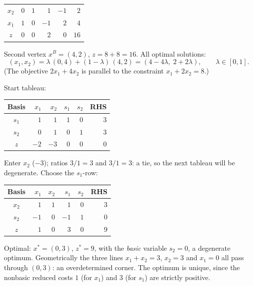 \begin{solutions}
\begin{center}
\begin{tabular}{c|rrrr|r}
        \hline
        $x_2$ & $0$ & $1$ & $1$ & $-1$ & $2$\\
        $x_1$ & $1$ & $0$ & $-1$ & $2$ & $4$\\
        \hline
        $z$ & $0$ & $0$ & $2$ & $0$ & $16$\\
        \hline
        \end{tabular}
        \end{center}
        Second vertex $x^{B}=(4,2)$, $z=8+8=16$. All optimal solutions:
        \[
          (x_1,x_2)=\lambda\,(0,4)+(1-\lambda)\,(4,2)
                   =(4-4\lambda,\;2+2\lambda),\qquad \lambda\in[0,1].
        \]
        (The objective $2x_1+4x_2$ is parallel to the constraint
        $x_1+2x_2=8$.)

  \item Start tableau:
        \begin{center}
        \begin{tabular}{c|rrrr|r}
        \hline
        Basis & $x_1$ & $x_2$ & $s_1$ & $s_2$ & RHS\\
        \hline
        $s_1$ & $1$ & $1$ & $1$ & $0$ & $3$\\
        $s_2$ & $0$ & $1$ & $0$ & $1$ & $3$\\
        \hline
        $z$ & $-2$ & $-3$ & $0$ & $0$ & $0$\\
        \hline
        \end{tabular}
        \end{center}
        Enter $x_2$ ($-3$); ratios $3/1=3$ and $3/1=3$: a tie, so the
        next tableau will be degenerate. Choose the $s_1$-row:
        \begin{center}
        \begin{tabular}{c|rrrr|r}
        \hline
        Basis & $x_1$ & $x_2$ & $s_1$ & $s_2$ & RHS\\
        \hline
        $x_2$ & $1$ & $1$ & $1$ & $0$ & $3$\\
        $s_2$ & $-1$ & $0$ & $-1$ & $1$ & $0$\\
        \hline
        $z$ & $1$ & $0$ & $3$ & $0$ & $9$\\
        \hline
        \end{tabular}
        \end{center}
        Optimal: $x^{*}=(0,3)$, $z^{*}=9$, with the \emph{basic} variable
        $s_2=0$, a degenerate optimum. Geometrically the three lines
        $x_1+x_2=3$, $x_2=3$ and $x_1=0$ all pass through $(0,3)$: an
        overdetermined corner. The optimum is unique, since the nonbasic
        reduced costs $1$ (for $x_1$) and $3$ (for $s_1$) are strictly
        positive.


\end{solutions}
